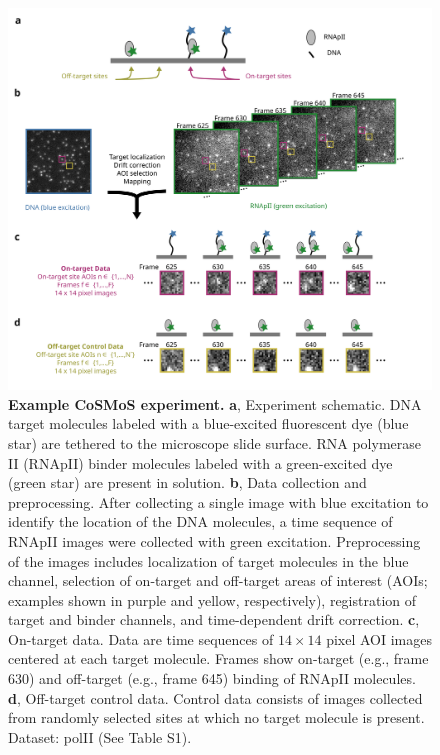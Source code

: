 \renewcommand{\figurename}{Fig.}

\begin{figure}[t]
\centering
\includegraphics[width=\textwidth]{figures/figure1/figure1.png}
\caption{\textbf{Example CoSMoS experiment.} \textbf{a}, Experiment schematic. DNA target molecules labeled with a blue-excited fluorescent dye (blue star) are tethered to the microscope slide surface. RNA polymerase II (RNApII) binder molecules labeled with a green-excited dye (green star) are present in solution. \textbf{b}, Data collection and preprocessing. After collecting a single image with blue excitation to identify the location of the DNA molecules, a time sequence of RNApII images were collected with green excitation.  Preprocessing of the images includes localization of target molecules in the blue channel, selection of on-target and off-target areas of interest (AOIs; examples shown in purple and yellow, respectively), registration of target and binder channels, and time-dependent drift correction. \textbf{c}, On-target data. Data are time sequences of $14 \times 14$ pixel AOI images centered at each target molecule. Frames show on-target (e.g., frame 630) and off-target (e.g., frame 645) binding of RNApII molecules. \textbf{d}, Off-target control data. Control data consists of images collected from randomly selected sites at which no target molecule is present. Dataset: polII (See Table S1). }
\label{fig:cosmos_experiment}
\end{figure}


